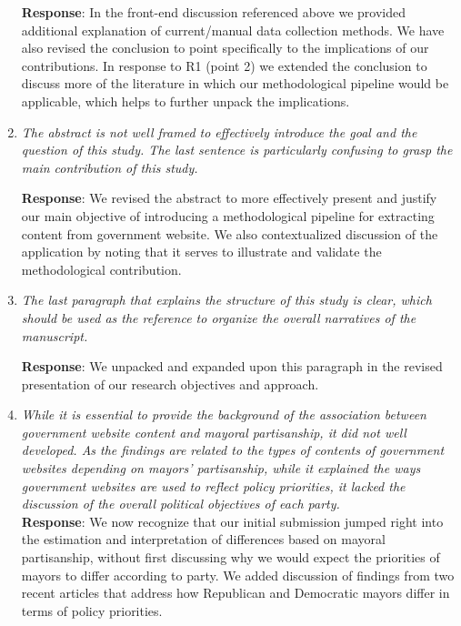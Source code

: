 \documentclass[12pt,titlepage]{article}
\begin{document}
\begin{enumerate}
    
    \textbf{Response}: In the front-end discussion referenced above we provided additional explanation of current/manual data collection methods. We have also revised the conclusion to point specifically to the implications of our contributions. In response to R1 (point 2) we extended the conclusion to discuss more of the literature in which our methodological pipeline would be applicable, which helps to further unpack the implications.
    
    

\item \emph{The abstract is not well framed to effectively introduce the goal and the question of this study. The last sentence is particularly confusing to grasp the main contribution of this study.}

     \textbf{Response}:  We revised the abstract to more effectively present and justify our main objective of introducing a methodological pipeline for extracting content from government website. We also contextualized discussion of the application by noting that it serves to illustrate and validate the methodological contribution.


\item \emph{The last paragraph that explains the structure of this study is clear, which should be used as the reference to organize the overall narratives of the manuscript.}

     \textbf{Response}: We unpacked and expanded upon this paragraph in the revised presentation of our research objectives and approach. 


\item \emph{ While it is essential to provide the background of the association between government website content and mayoral partisanship, it did not well developed. As the findings are related to the types of contents of government websites depending on mayors’ partisanship, while it explained the ways government websites are used to reflect policy priorities, it lacked the discussion of the overall political objectives of each party. }\\

    \textbf{Response}: We now recognize that our initial submission jumped right into the estimation and interpretation of differences based on mayoral partisanship, without first discussing why we would expect the priorities of mayors to differ according to party. We added discussion of findings from two recent articles that address how Republican and Democratic mayors differ in terms of policy priorities.
    

\end{enumerate}
\end{document}
